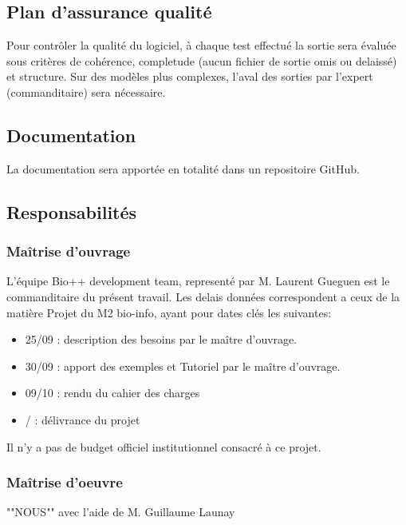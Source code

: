 \documentclass{article}
\begin{document}
\subsection{ Plan d'assurance qualité }
 Pour contrôler la qualité du logiciel, à chaque test effectué la sortie sera  évaluée sous critères de cohérence, completude (aucun fichier de sortie omis ou delaissé) et structure. Sur des modèles plus complexes, l'aval des sorties par l'expert (commanditaire) sera nécessaire.
 
\subsection{Documentation} 
La documentation sera apportée en totalité dans un repositoire GitHub.

	
\subsection{Responsabilités}
\subsubsection{Maîtrise d'ouvrage}
L'équipe Bio++ development team, representé par M. Laurent Gueguen est le commanditaire du présent travail. Les delais données correspondent a ceux de la matière Projet du M2 bio-info, ayant pour dates clés les suivantes:
\begin{itemize}
	\item 25/09 : description des besoins par le maître d'ouvrage.
	\item 30/09 : apport des exemples et Tutoriel par le maître d'ouvrage.
	\item 09/10 : rendu du cahier des charges 
	\item / : délivrance du projet 
\end{itemize}
Il n'y a pas de budget officiel institutionnel consacré à ce projet. 

\subsubsection{Maîtrise d'oeuvre}
""NOUS"" avec l'aide de M. Guillaume Launay
\end{document}
